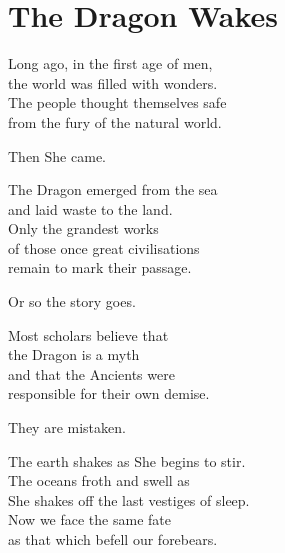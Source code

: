 \documentclass[12pt, a5paper, parskip=half-]{scrartcl}
\begin{document}
\section*{\huge \phantom{a} \hfill The Dragon Wakes \hfill \phantom{a}} \label{section:the-dragon-wakes}
\vfill
Long ago, in the first age of men,\\
the world was filled with wonders. \\
The people thought themselves safe \\
from the fury of the natural world.

\smallskip

Then She came.

\smallskip

The Dragon emerged from the sea\\and laid waste to the land.\\
Only the grandest works\\of those once great civilisations\\remain to mark their passage.

\smallskip

Or so the story goes.

\smallskip

Most scholars believe that\\the Dragon is a myth\\and that the Ancients were\\responsible for their own demise.

\smallskip

They are mistaken. 

\smallskip

The earth shakes as She begins to stir.\\
The oceans froth and swell as\\She shakes off the last vestiges of sleep.\\
Now we face the same fate\\as that which befell our forebears.
\vfill

\newpage


\raggedright
\end{document}
